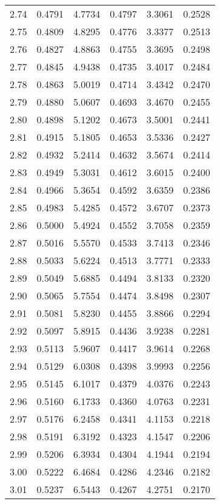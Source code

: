\documentclass{article}
\begin{document}
\begin{longtable}{cccccc}
2.74 & 0.4791 & 4.7734 & 0.4797 & 3.3061 & 0.2528 \\
2.75 & 0.4809 & 4.8295 & 0.4776 & 3.3377 & 0.2513 \\
2.76 & 0.4827 & 4.8863 & 0.4755 & 3.3695 & 0.2498 \\
2.77 & 0.4845 & 4.9438 & 0.4735 & 3.4017 & 0.2484 \\
2.78 & 0.4863 & 5.0019 & 0.4714 & 3.4342 & 0.2470 \\
2.79 & 0.4880 & 5.0607 & 0.4693 & 3.4670 & 0.2455 \\
2.80 & 0.4898 & 5.1202 & 0.4673 & 3.5001 & 0.2441 \\
2.81 & 0.4915 & 5.1805 & 0.4653 & 3.5336 & 0.2427 \\
2.82 & 0.4932 & 5.2414 & 0.4632 & 3.5674 & 0.2414 \\
2.83 & 0.4949 & 5.3031 & 0.4612 & 3.6015 & 0.2400 \\
2.84 & 0.4966 & 5.3654 & 0.4592 & 3.6359 & 0.2386 \\
2.85 & 0.4983 & 5.4285 & 0.4572 & 3.6707 & 0.2373 \\
2.86 & 0.5000 & 5.4924 & 0.4552 & 3.7058 & 0.2359 \\
2.87 & 0.5016 & 5.5570 & 0.4533 & 3.7413 & 0.2346 \\
2.88 & 0.5033 & 5.6224 & 0.4513 & 3.7771 & 0.2333 \\
2.89 & 0.5049 & 5.6885 & 0.4494 & 3.8133 & 0.2320 \\
2.90 & 0.5065 & 5.7554 & 0.4474 & 3.8498 & 0.2307 \\
2.91 & 0.5081 & 5.8230 & 0.4455 & 3.8866 & 0.2294 \\
2.92 & 0.5097 & 5.8915 & 0.4436 & 3.9238 & 0.2281 \\
2.93 & 0.5113 & 5.9607 & 0.4417 & 3.9614 & 0.2268 \\
2.94 & 0.5129 & 6.0308 & 0.4398 & 3.9993 & 0.2256 \\
2.95 & 0.5145 & 6.1017 & 0.4379 & 4.0376 & 0.2243 \\
2.96 & 0.5160 & 6.1733 & 0.4360 & 4.0763 & 0.2231 \\
2.97 & 0.5176 & 6.2458 & 0.4341 & 4.1153 & 0.2218 \\
2.98 & 0.5191 & 6.3192 & 0.4323 & 4.1547 & 0.2206 \\
2.99 & 0.5206 & 6.3934 & 0.4304 & 4.1944 & 0.2194 \\
3.00 & 0.5222 & 6.4684 & 0.4286 & 4.2346 & 0.2182 \\
3.01 & 0.5237 & 6.5443 & 0.4267 & 4.2751 & 0.2170 \\

\end{longtable}
\end{document}
